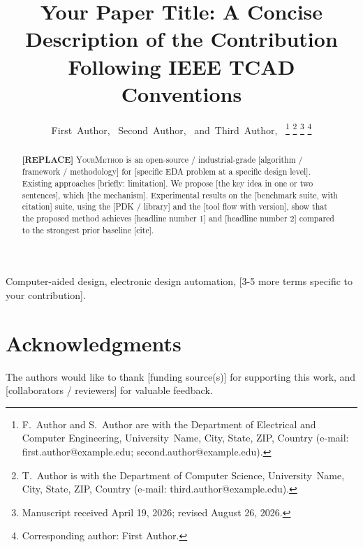 \documentclass[journal,letterpaper]{IEEEtran}
\title{Your Paper Title: A Concise Description of the Contribution Following IEEE TCAD Conventions}
\author{First~Author,~\IEEEmembership{Member,~IEEE,}
        Second~Author,~\IEEEmembership{Senior~Member,~IEEE,}
        and~Third~Author,~\IEEEmembership{Fellow,~IEEE}%
\thanks{F.~Author and S.~Author are with the Department of Electrical and Computer Engineering, University~Name, City, State, ZIP, Country (e-mail: first.author@example.edu; second.author@example.edu).}%
\thanks{T.~Author is with the Department of Computer Science, University~Name, City, State, ZIP, Country (e-mail: third.author@example.edu).}%
\thanks{Manuscript received April 19, 2026; revised August 26, 2026.}%
\thanks{Corresponding author: First Author.}%
}
\newcommand{\method}{\textsc{YourMethod}}     %
\begin{document}
\maketitle

\begin{abstract}
%

\textbf{[REPLACE]} \method{} is an open-source / industrial-grade
[algorithm / framework / methodology] for [specific EDA problem at a
specific design level]. Existing approaches [briefly: limitation].
We propose [the key idea in one or two sentences], which [the mechanism].
Experimental results on the [benchmark suite, with citation] suite, using
the [PDK / library] and the [tool flow with version], show that the
proposed method achieves [headline number 1] and [headline number 2]
compared to the strongest prior baseline [cite].
\end{abstract}

\begin{IEEEkeywords}
Computer-aided design, electronic design automation, [3-5 more terms
specific to your contribution].
\end{IEEEkeywords}

\IEEEpeerreviewmaketitle









\section*{Acknowledgments}
The authors would like to thank [funding source(s)] for supporting this
work, and [collaborators / reviewers] for valuable feedback. %
\end{document}
